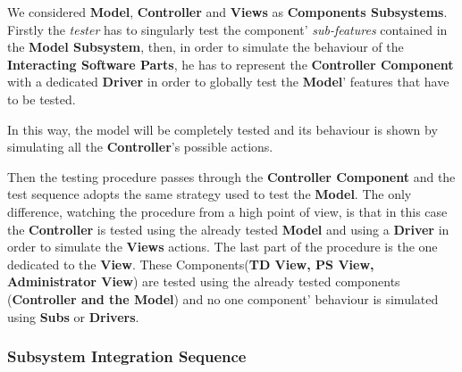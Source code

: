 We considered \textbf{Model}, \textbf{Controller} and \textbf{Views} as \textbf{Components Subsystems}.
Firstly the \textit{tester} has to singularly test the component' \textit{sub-features} contained in the \textbf{Model Subsystem}, then, in order to simulate the behaviour of the \textbf{Interacting Software Parts}, he has to represent the \textbf{Controller Component} with a dedicated \textbf{Driver} in order to globally test the \textbf{Model}' features that have to be tested.\par In this way, the model will be completely tested and its behaviour is shown by simulating all the \textbf{Controller}'s possible actions.\par
Then the testing procedure passes through the \textbf{Controller Component} and the test sequence adopts the same strategy used to test the \textbf{Model}. The only difference, watching the procedure from a high point of view, is that in this case the \textbf{Controller} is tested using the already tested \textbf{Model} and using a \textbf{Driver} in order to simulate the \textbf{Views} actions.
The last part of the procedure is the one dedicated to the \textbf{View}. These Components(\textbf{TD View, PS View, Administrator View}) are tested using the already tested components (\textbf{Controller and the Model}) and no one component' behaviour is simulated using \textbf{Subs} or \textbf{Drivers}.

\subsubsection{Subsystem Integration Sequence}



